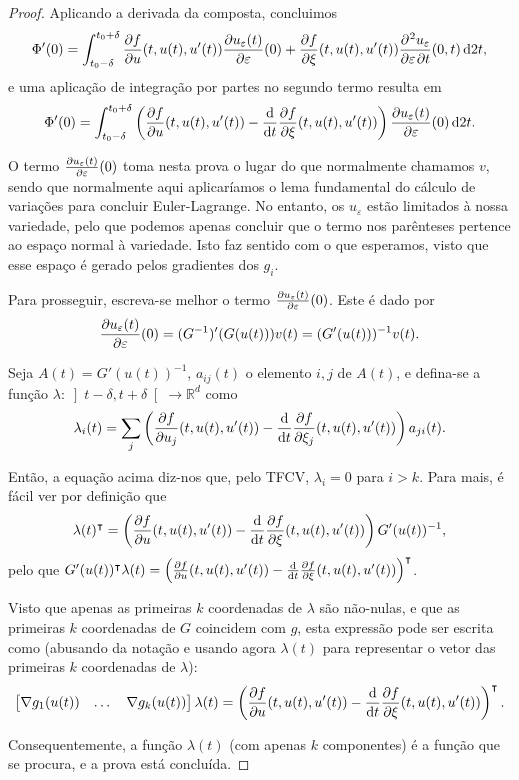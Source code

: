 \documentclass{article}
\theoremstyle{plain}
\theoremstyle{nonumberplain}
\newtheorem{proof}{Proof}
\newcommand{\R}{\mathbb{R}}
\newcommand{\tr}{\intercal}
\begin{document}
\begin{proof}
Aplicando a derivada da composta, concluimos
\[\Phi'(0) = \int_{t_0 - \delta}^{t_0 + \delta} \diffp fu (t, u(t), u'(t)) \diffp {u_\varepsilon(t)} \varepsilon(0) + \diffp f \xi (t, u(t), u'(t)) \diffp{u_\varepsilon}{\varepsilon, t}(0,t)\dl2 t,\]
e uma aplicação de integração por partes no segundo termo resulta em
\[\Phi'(0) = \int_{t_0 - \delta}^{t_0 + \delta} \left( \diffp fu (t, u(t), u'(t))  - \diff*{\diffp f \xi (t, u(t), u'(t))}t \right) \diffp {u_\varepsilon(t)} \varepsilon(0)\dl2 t.\]

O termo $\diffp {u_\varepsilon(t)} \varepsilon(0)$ toma nesta prova o lugar do que normalmente chamamos $v$, sendo que normalmente aqui aplicaríamos o lema fundamental do cálculo de variações para concluir Euler-Lagrange. No entanto, os $u_\varepsilon$ estão limitados à nossa variedade, pelo que podemos apenas concluir que o termo nos parênteses pertence ao espaço normal à variedade. Isto faz sentido com o que esperamos, visto que esse espaço é gerado pelos gradientes dos $g_i$.

Para prosseguir, escreva-se melhor o termo $\diffp {u_\varepsilon(t)} \varepsilon(0)$. Este é dado por
\[\diffp {u_\varepsilon(t)} \varepsilon(0) = (G^{-1})'(G(u(t))) v(t) = (G'(u(t)))^{-1} v(t).\]

Seja $A(t) = G'(u(t))^{-1}$, $a_{ij}(t)$ o elemento $i,j$ de $A(t)$, e defina-se a função $\lambda \colon \left]t-\delta,t+\delta\right[ \to \R^d$ como
\[\lambda_i(t) = \sum_j \left( \diffp f{u_j} (t, u(t), u'(t))  - \diff*{\diffp f {\xi_j} (t, u(t), u'(t))}t \right) a_{ji}(t). \]

Então, a equação acima diz-nos que, pelo TFCV, $\lambda_i = 0$ para $i > k$. Para mais, é fácil ver por definição que
\[\lambda(t)^\tr = \left( \diffp fu (t, u(t), u'(t))  - \diff*{\diffp f \xi (t, u(t), u'(t))}t \right) G'(u(t))^{-1},\]
pelo que $G'(u(t))^\tr \lambda(t) = \left( \diffp fu (t, u(t), u'(t))  - \diff*{\diffp f \xi (t, u(t), u'(t))}t \right)^\tr$.

Visto que apenas as primeiras $k$ coordenadas de $\lambda$ são não-nulas, e que as primeiras $k$ coordenadas de $G$ coincidem com $g$, esta expressão pode ser escrita como (abusando da notação e usando agora $\lambda(t)$ para representar o vetor das primeiras $k$ coordenadas de $\lambda$):
\[
\begin{bmatrix}
\nabla g_1(u(t)) & \dots & \nabla g_k(u(t))
\end{bmatrix}
\lambda(t)
=
\left( \diffp fu (t, u(t), u'(t))  - \diff*{\diffp f \xi (t, u(t), u'(t))}t \right)^\tr.
\]

Consequentemente, a função $\lambda(t)$ (com apenas $k$ componentes) é a função que se procura, e a prova está concluída.
\end{proof}
\end{document}
